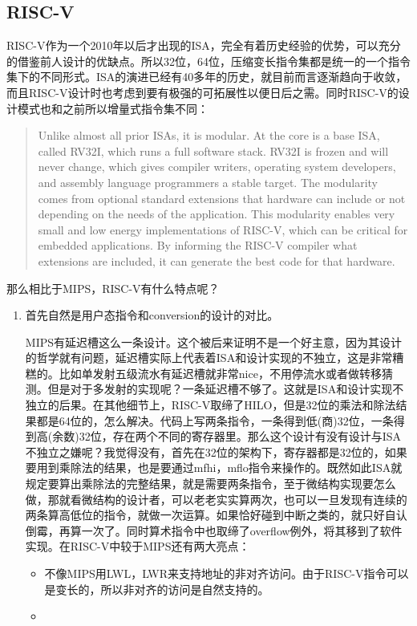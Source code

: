 \documentclass[twocolumn,10pt]{article}
\begin{document}
\subsection{RISC-V}
RISC-V作为一个2010年以后才出现的ISA，完全有着历史经验的优势，可以充分的借鉴前人设计的优缺点。所以32位，64位，压缩变长指令集都是统一的一个指令集下的不同形式。ISA的演进已经有40多年的历史，就目前而言逐渐趋向于收敛，而且RISC-V设计时也考虑到要有极强的可拓展性以便日后之需。同时RISC-V的设计模式也和之前所以增量式指令集不同：
\begin{quote}
	Unlike almost all prior ISAs, it is modular. At the core is a base ISA, called RV32I, which runs a full software stack. RV32I is frozen and will never change, which gives compiler writers, operating system developers, and assembly language programmers a stable target. The modularity comes from optional standard extensions that hardware can include or not depending on the needs of the application. This modularity enables very small and low energy implementations of RISC-V, which can be critical for embedded applications. By informing the RISC-V compiler what extensions are included, it can generate the best code for that hardware.
\end{quote}
那么相比于MIPS，RISC-V有什么特点呢？
\begin{enumerate}
	\item 首先自然是用户态指令和conversion的设计的对比。
	
	MIPS有延迟槽这么一条设计。这个被后来证明不是一个好主意，因为其设计的哲学就有问题，延迟槽实际上代表着ISA和设计实现的不独立，这是非常糟糕的。比如单发射五级流水有延迟槽就非常nice，不用停流水或者做转移猜测。但是对于多发射的实现呢？一条延迟槽不够了。这就是ISA和设计实现不独立的后果。在其他细节上，RISC-V取缔了HILO，但是32位的乘法和除法结果都是64位的，怎么解决。代码上写两条指令，一条得到低(商)32位，一条得到高(余数)32位，存在两个不同的寄存器里。那么这个设计有没有设计与ISA不独立之嫌呢？我觉得没有，首先在32位的架构下，寄存器都是32位的，如果要用到乘除法的结果，也是要通过mfhi，mflo指令来操作的。既然如此ISA就规定要算出乘除法的完整结果，就是需要两条指令，至于微结构实现要怎么做，那就看微结构的设计者，可以老老实实算两次，也可以一旦发现有连续的两条算高低位的指令，就做一次运算。如果恰好碰到中断之类的，就只好自认倒霉，再算一次了。同时算术指令中也取缔了overflow例外，将其移到了软件实现。在RISC-V中较于MIPS还有两大亮点：
	\begin{itemize}
		\item 不像MIPS用LWL，LWR来支持地址的非对齐访问。由于RISC-V指令可以是变长的，所以非对齐的访问是自然支持的。
		\item 
	\end{itemize}
\end{enumerate}
\end{document}
